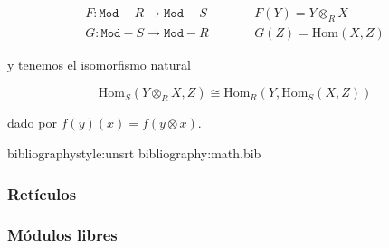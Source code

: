 \documentclass[11pt]{article}
\begin{document}
\begin{itemize}
\begin{itemize}
\[\begin{aligned}
F : \mathtt{Mod-}R \longrightarrow \mathtt{Mod-}S
&\qquad&
F(Y) = Y \otimes_R X\\
G : \mathtt{Mod-}S \longrightarrow \mathtt{Mod-}R
&\qquad&
G(Z) = \mathrm{Hom}(X,Z)
\end{aligned}\]

y tenemos el isomorfismo natural

\[
\mathrm{Hom}_{S}(Y \otimes_{R} X, Z) \cong
\mathrm{Hom}_{R}(Y, \mathrm{Hom}_{S}(X,Z))
\]

dado por $\widehat{f}(y)(x) = f(y \otimes x)$.

bibliographystyle:unsrt
bibliography:math.bib
\end{itemize}
\end{itemize}
\subsubsection*{Retículos}
\label{sec-7-5-2}
\subsubsection*{Módulos libres}
\label{sec-7-5-3}
\end{document}
